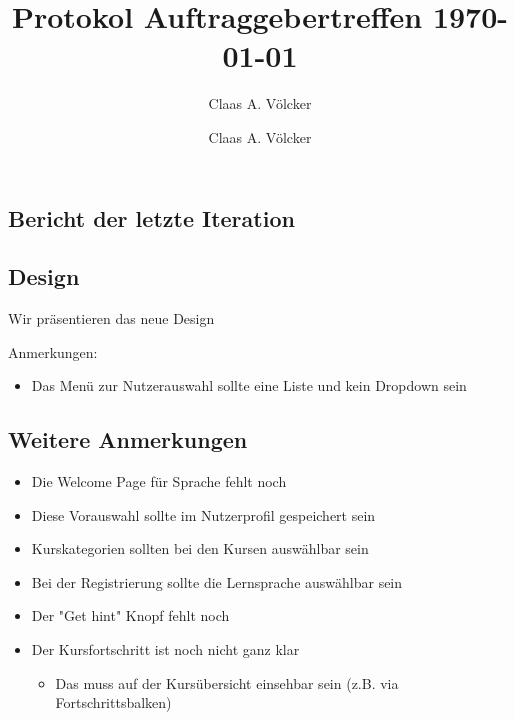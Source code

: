 \documentclass[colorback, accentcolor=tud1c, paper=a4]{tudexercise}
\title{Protokol Auftraggebertreffen \today}
\subtitle{Claas A. Völcker}
\author{Claas A. Völcker}
\begin{document}
	
\maketitle

\begin{multicols}{2}

\section{Bericht der letzte Iteration}
\subsection{Design}
Wir präsentieren das neue Design

Anmerkungen:
\begin{itemize}
\item Das Menü zur Nutzerauswahl sollte eine Liste und kein Dropdown sein
\end{itemize}

\subsection{Weitere Anmerkungen}
\begin{itemize}
\item Die Welcome Page für Sprache fehlt noch
\item Diese Vorauswahl sollte im Nutzerprofil gespeichert sein
\item Kurskategorien sollten bei den Kursen auswählbar sein
\item Bei der Registrierung sollte die Lernsprache auswählbar sein
\item Der "Get hint" Knopf fehlt noch
\item Der Kursfortschritt ist noch nicht ganz klar
	\begin{itemize}
	\item Das muss auf der Kursübersicht einsehbar sein (z.B. via Fortschrittsbalken)
	\end{itemize}
\end{itemize}


\end{multicols}
\end{document}
